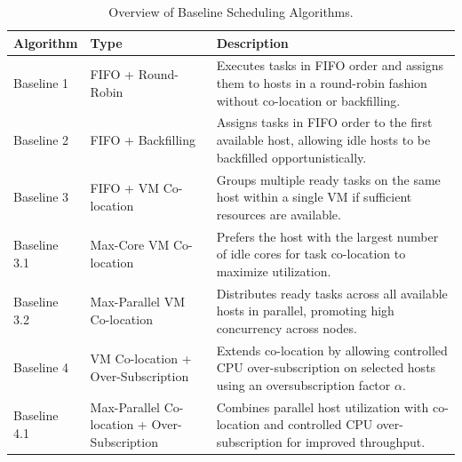 \begin{table}[H]
    \centering
    \caption{Overview of Baseline Scheduling Algorithms.}
    \label{tab:baseline_overview}
    \begin{tabularx}{\textwidth}{l l X}
        \toprule
        \textbf{Algorithm} & \textbf{Type}                                & \textbf{Description}                                                                                                          \\
        \midrule
        Baseline 1         & FIFO + Round-Robin                           & Executes tasks in FIFO order and assigns them to hosts in a round-robin fashion without co-location or backfilling.           \\

        Baseline 2         & FIFO + Backfilling                           & Assigns tasks in FIFO order to the first available host, allowing idle hosts to be backfilled opportunistically.              \\

        Baseline 3         & FIFO + VM Co-location                        & Groups multiple ready tasks on the same host within a single VM if sufficient resources are available.                        \\

        Baseline 3.1       & Max-Core VM Co-location                      & Prefers the host with the largest number of idle cores for task co-location to maximize utilization.                          \\

        Baseline 3.2       & Max-Parallel VM Co-location                  & Distributes ready tasks across all available hosts in parallel, promoting high concurrency across nodes.                      \\

        Baseline 4         & VM Co-location + Over-Subscription           & Extends co-location by allowing controlled CPU over-subscription on selected hosts using an oversubscription factor $\alpha$. \\

        Baseline 4.1       & Max-Parallel Co-location + Over-Subscription & Combines parallel host utilization with co-location and controlled CPU over-subscription for improved throughput.             \\
        \bottomrule
    \end{tabularx}
\end{table}

